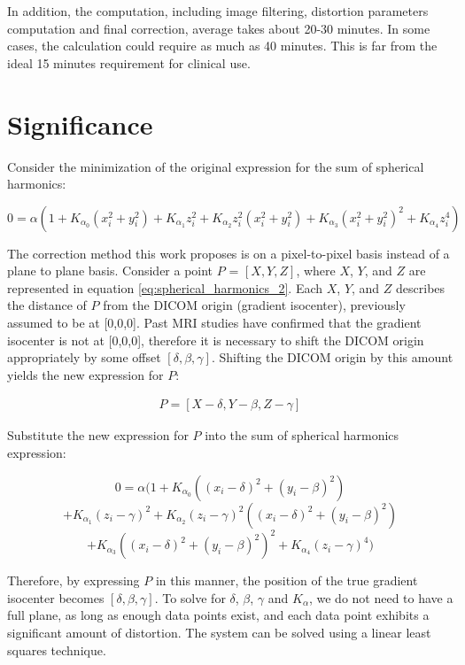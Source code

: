 \documentclass{sbthesis}
\begin{document}
In addition, the computation, including image filtering, distortion parameters
computation and final correction, average takes about 20-30 minutes.  In some cases, the calculation
could require as much as 40 minutes. This is far from the ideal 15 minutes requirement for clinical use.

\section{Significance}


Consider the minimization of the original expression for the sum of spherical harmonics:

\begin{equation} \label{eq:spherical_harmonics_2}
0 = \alpha(1 + K_{\alpha_0}(x^2_i + y^2_i) + K_{\alpha_1}z^2_i +
K_{\alpha_2}z^2_i(x^2_i + y^2_i) + K_{\alpha_3}(x^2_i + y^2_i)^2 +
K_{\alpha_4}z^4_i)
\end{equation}

The correction method this work proposes is on a pixel-to-pixel basis instead of a plane to plane basis.
Consider a point $P$ = $[X,Y,Z]$, where $X$, $Y$, and $Z$ are represented in equation \ref{eq:spherical_harmonics_2}. Each $X$, $Y$, and $Z$ describes the distance of $P$ from the DICOM origin (gradient isocenter), previously assumed to be at [0,0,0].  Past MRI studies have confirmed that the gradient isocenter is not at [0,0,0], therefore it is necessary to shift the DICOM origin appropriately by some offset $[\delta,\beta,\gamma]$.  Shifting the DICOM origin by this amount yields the new expression for $P$:

\begin{eqnarray}
P = [X - \delta, Y - \beta, Z - \gamma]
\end{eqnarray}

Substitute the new expression for $P$ into the sum of spherical harmonics expression:

$$0 = \alpha(1 + K_{\alpha_0}((x_i - \delta)^2 + (y_i - \beta)^2)$$
$$+ K_{\alpha_1}(z_i - \gamma)^2 + K_{\alpha_2}(z_i - \gamma)^2((x_i - \delta)^2 + (y_i - \beta)^2)$$
$$+ K_{\alpha_3}((x_i - \delta)^2 + (y_i - \beta)^2)^2 + K_{\alpha_4}(z_i - \gamma)^4)$$

Therefore, by expressing $P$ in this manner, the position of the true gradient isocenter becomes
$[\delta, \beta, \gamma]$. To solve for $\delta$, $\beta$, $\gamma$ and $K_{\alpha}$, we do not need
to have a full plane, as long as enough data points exist, and each data point exhibits a significant amount of distortion. The system can be solved using a linear least squares technique.
\end{document}
